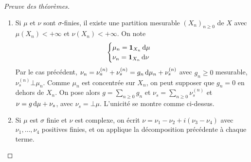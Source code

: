 \begin{proof}[Preuve des théorèmes]
\begin{enumerate}
Cela donne le théorème de Radon-Nikodyn dans le cas $\mu,\nu$ positives fines. Montrons l'unicité. Supposons que $\nu= \nu_a+\nu_s = \nu_a' + \nu_s'$
Alors $\nu_a- \nu_a'= \nu_s'-\nu_s$, et il existe $N,N'\in \mathcal{A}$, avec $\mu(N)=\mu(N')=0$ et $\nu_s'((N')^c)=\nu_s (N^c)=0$.
Alors si $A\in \mathcal{A}$,
\begin{align*}
(\nu_s' -\nu_{s})(A) &= (\nu_s' -\nu_s)(A\cap (N\cup N' ))\\
&= (\nu_a- \nu_a' )(A\cap (N\cup N' ))\\
&=0 
\end{align*}
car $\mu(A\cap (N\cup N' ))\leq \mu(N\cup N' )=0$, donc $\nu_s=\nu_s'$ et $\nu_a=\nu_a'$.
De même, si $h\diff\mu=h'\diff\mu=\nu$ avec $h,h'\geq 0$, alors
\[ \int_{h' >h}h' \diff\mu = \nu(\{h' >h\})= \int_{h' >h}h\diff\mu\]
donc \[ \int_{h'>h}(h'-h)\diff\mu =0,\] d'où $\mu(\{h'>h\})=0$
et $h'\leq h$ $\mu$-presque partout, donc par symétrie des rôles $h=h'$
\item 
    Si $\mu$ et $\nu$ sont $\sigma$-finies,
il existe une partition mesurable $(X_n)_{n\geq 0}$ de $X$ avec $\mu(X_n)<+\infty$ et $\nu(X_n)<+\infty$.
On note \[
    \begin{cases}
    \mu_n=\bm{1}_{X_n}\mathop{}\!\mathrm d\mu\\ \nu_n=\bm{1}_{X_n}\mathop{}\!\mathrm d\nu
    \end{cases}\]
Par le cas précédent, $\nu_n = \nu_a^{(n)}+\nu_s^{(n)}=g_n \mathop{}\!\mathrm d\mu_n +\nu_s^{(n)}$ avec $g_n\geq 0$ mesurable, $\nu_s^{(n)}\bot \mu_n$.
Comme $\mu_n$ est concentrée sur $X_n$, on peut supposer que $g_n=0$ en dehors de $X_n$.
On pose alors $g= \sum_{n\geq0} g_n$ et $\nu_s =\sum_{n\geq 0}\nu_s^{(n)}$
et $\nu=g\mathop{}\!\mathrm d\mu+\nu_s$, avec $\nu_s=\bot \mu$. L'unicité se montre comme ci-dessus.
\item 
    Si $\mu$ est $\sigma$ finie et $\nu$ est complexe,
on écrit $\nu=\nu_1-\nu_2 +i(\nu_3-\nu_4)$ avec $\nu_1,\dots,\nu_4$ positives finies, et on applique la décomposition précédente à chaque terme.
    \end{enumerate}
\end{proof}
